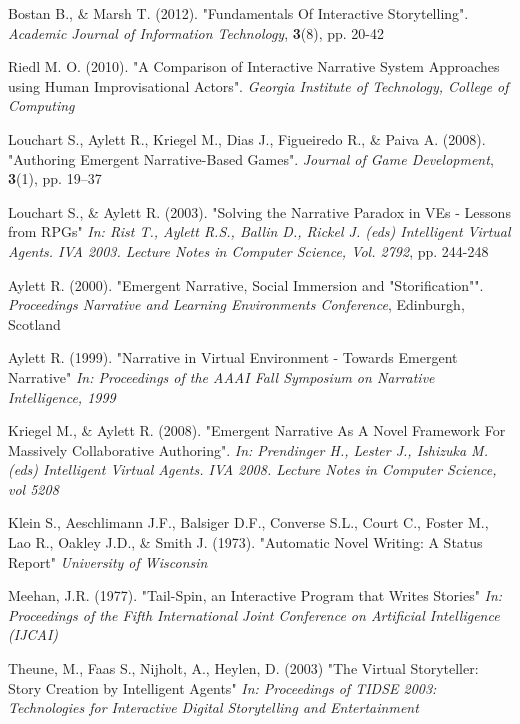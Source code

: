 \documentclass{sig-alternate-05-2015}
\begin{document}
\begin{thebibliography}{20}

Bostan B., \& Marsh T. (2012). 
"Fundamentals Of Interactive Storytelling". 
\textit{Academic Journal of Information Technology}, \textbf{3}(8), pp. 20-42

Riedl M. O. (2010). 
"A Comparison of Interactive Narrative System Approaches using Human Improvisational Actors".
\textit{Georgia Institute of Technology, College of Computing}

Louchart S., Aylett R., Kriegel M., Dias J., Figueiredo R., \& Paiva A. (2008).
"Authoring Emergent Narrative-Based Games".
\textit{Journal of Game Development}, \textbf{3}(1), pp. 19–37

Louchart S., \& Aylett R. (2003).
"Solving the Narrative Paradox in VEs - Lessons from RPGs"
\textit{In: Rist T., Aylett R.S., Ballin D., Rickel J. (eds) Intelligent Virtual Agents. IVA 2003. Lecture Notes in Computer Science, Vol. 2792}, pp. 244-248

Aylett R. (2000).
"Emergent Narrative, Social Immersion and "Storification"".
\textit{Proceedings Narrative and Learning Environments Conference}, Edinburgh, Scotland

Aylett R. (1999).
"Narrative in Virtual Environment - Towards Emergent Narrative"
\textit{In: Proceedings of the AAAI Fall Symposium on Narrative Intelligence, 1999}

Kriegel M., \& Aylett R. (2008).
"Emergent Narrative As A Novel Framework For Massively Collaborative Authoring".
\textit{In: Prendinger H., Lester J., Ishizuka M. (eds) Intelligent Virtual Agents. IVA 2008. Lecture Notes in Computer Science, vol 5208}

Klein S., Aeschlimann J.F., Balsiger D.F., Converse S.L., Court C., Foster M., Lao R., Oakley J.D., \& Smith J. (1973).
"Automatic Novel Writing: A Status Report"
\textit{University of Wisconsin}

Meehan, J.R. (1977).
"Tail-Spin, an Interactive Program that Writes Stories"
\textit{In: Proceedings of the Fifth International Joint Conference on Artificial Intelligence (IJCAI)}

Theune, M., Faas S., Nijholt, A., Heylen, D. (2003)
"The Virtual Storyteller: Story Creation by Intelligent Agents"
\textit{In: Proceedings of TIDSE 2003: Technologies for Interactive Digital Storytelling and Entertainment}

\end{thebibliography}
 
\end{document}
